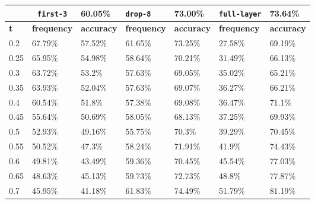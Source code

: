
\begin{table}[t]
\centering
\begin{tabular}{lllllll} %
\hline

\multicolumn{1}{c}{}& 
\multicolumn{1}{c}{\texttt{first-3}} & \multicolumn{1}{l|}{60.05\%} 
& \multicolumn{1}{l}{\texttt{drop-8}} & \multicolumn{1}{l|}{73.00\%}
& \multicolumn{1}{l}{\texttt{full-layer}} & 73.64\%
\\ \hline
\multicolumn{1}{l|}{\textbf{t}} &
\multicolumn{1}{l|}{\textbf{frequency}} & 
\multicolumn{1}{l|}{\textbf{accuracy}} & 
\multicolumn{1}{l|}{\textbf{frequency}} & 
\multicolumn{1}{l|}{\textbf{accuracy}} & 
\multicolumn{1}{l|}{\textbf{frequency}} & 
\multicolumn{1}{l|}{\textbf{accuracy}} \\ \hline
	\multicolumn{1}{l|}{0.2}&  67.79\% & \multicolumn{1}{l|}{57.52\%}& 61.65\% & \multicolumn{1}{l|}{73.25\%}& 27.58\% & 69.19\%\\ 
\multicolumn{1}{l|}{0.25}&  65.95\% & \multicolumn{1}{l|}{54.98\%}& 58.64\% & \multicolumn{1}{l|}{70.21\%}& 31.49\% & 66.13\%\\ 
\multicolumn{1}{l|}{0.3}&  63.72\% & \multicolumn{1}{l|}{53.2\%}& 57.63\% & \multicolumn{1}{l|}{69.05\%}& 35.02\% & 65.21\%\\ 
\multicolumn{1}{l|}{0.35}&  63.93\% & \multicolumn{1}{l|}{52.04\%}& 57.63\% & \multicolumn{1}{l|}{69.07\%}& 36.27\% & 66.21\%\\ 
\multicolumn{1}{l|}{0.4}&  60.54\% & \multicolumn{1}{l|}{51.8\%}& 57.38\% & \multicolumn{1}{l|}{69.08\%}& 36.47\% & 71.1\%\\ 
\multicolumn{1}{l|}{0.45}&  55.64\% & \multicolumn{1}{l|}{50.69\%}& 58.05\% & \multicolumn{1}{l|}{68.13\%}& 37.25\% & 69.93\%\\ 
\multicolumn{1}{l|}{0.5}&  52.93\% & \multicolumn{1}{l|}{49.16\%}& 55.75\% & \multicolumn{1}{l|}{70.3\%}& 39.29\% & 70.45\%\\ 
\multicolumn{1}{l|}{0.55}&  50.52\% & \multicolumn{1}{l|}{47.3\%}& 58.24\% & \multicolumn{1}{l|}{71.91\%}& 41.9\% & 74.43\%\\ 
\multicolumn{1}{l|}{0.6}&  49.81\% & \multicolumn{1}{l|}{43.49\%}& 59.36\% & \multicolumn{1}{l|}{70.45\%}& 45.54\% & 77.03\%\\ 
\multicolumn{1}{l|}{0.65}&  48.63\% & \multicolumn{1}{l|}{45.13\%}& 59.73\% & \multicolumn{1}{l|}{72.73\%}& 48.8\% & 77.87\%\\ 
\multicolumn{1}{l|}{0.7}&  45.95\% & \multicolumn{1}{l|}{41.18\%}& 61.83\% & \multicolumn{1}{l|}{74.49\%}& 51.79\% & 81.19\%\\ 

\end{tabular}
\end{table}
